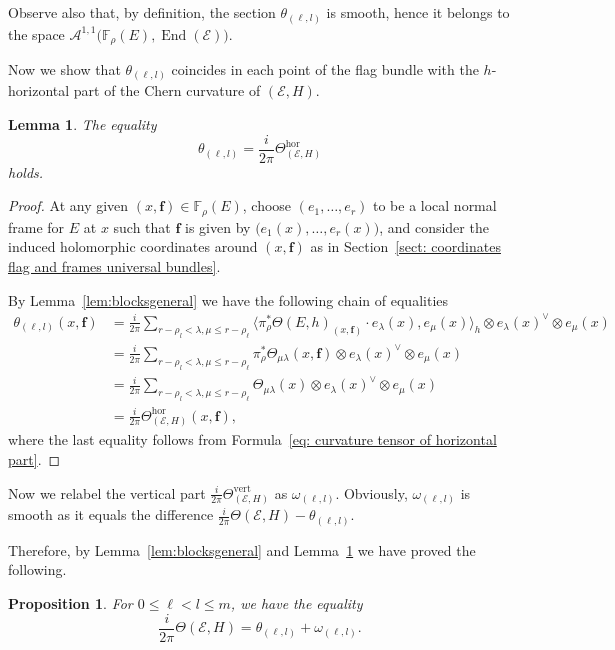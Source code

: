 \documentclass[a4paper]{amsart}
\theoremstyle{plain}%
\newtheorem{lemma}[theorem]{Lemma}
\newtheorem{proposition}[theorem]{Proposition}
\theoremstyle{definition}
\theoremstyle{remark}
\newcommand{\FF}{\mathbb{F}}
\begin{document}
Observe also that, by definition, the section $ \theta_{(\ell,l)} $ is smooth, hence it belongs to the space $ \mathcal{A}^{1,1}\bigl(\FF_{\rho}(E),\operatorname{End}(\mathcal{E})\bigr) $.

Now we show that $ \theta_{(\ell,l)} $ coincides in each point of the flag bundle with the $ h $-horizontal part of the Chern curvature of $ (\mathcal{E},H) $.
\begin{lemma}\label{lem: definizione di theta generale}
	The equality
	\[
	\theta_{(\ell,l)} = \frac{i}{2\pi}\Theta_{(\mathcal{E},H)}^{\operatorname{hor}}
	\]
	holds.
\end{lemma}
\begin{proof}
	At any given $ (x,\mathbf{f}) \in \FF_{\rho}(E) $, choose $ (e_1,\dots,e_r) $ to be a local normal frame for $ E $ at $ x $ such that $ \mathbf{f} $ is given by $ \bigl(e_1(x),\dots,e_r(x)\bigr) $, and consider the induced holomorphic coordinates around $ (x,\mathbf{f})$ as in Section~\ref{sect: coordinates flag and frames universal bundles}.
	
	By Lemma~\ref{lem:blocksgeneral} we have the following chain of equalities
	\begin{align*}
		\theta_{(\ell,l)}(x,\mathbf{f}) &= \frac{i}{2\pi} \sum_{r-\rho_l < \lambda,\mu \le r-\rho_{\ell}} \bigl\langle \pi_{\rho}^*\Theta(E,h)_{(x,\mathbf{f})}\cdot {e_\lambda(x)}, {e_\mu(x)} \bigr\rangle_h \otimes {e_{\lambda}(x)}^{\vee} \otimes e_{\mu}(x) \\
		&= \frac{i}{2\pi} \sum_{r-\rho_l < \lambda,\mu \le r-\rho_{\ell}} \pi_{\rho}^*\Theta_{\mu\lambda}(x,\mathbf{f}) \otimes {e_{\lambda}(x)}^{\vee} \otimes e_{\mu}(x) \\
		&= \frac{i}{2\pi} \sum_{r-\rho_l < \lambda,\mu \le r-\rho_{\ell}} \Theta_{\mu\lambda}(x) \otimes {e_{\lambda}(x)}^{\vee} \otimes e_{\mu}(x) \\
		&= \frac{i}{2\pi} \Theta_{(\mathcal{E},H)}^{\operatorname{hor}}(x,\mathbf{f}),
	\end{align*}
	where the last equality follows from Formula~\eqref{eq: curvature tensor of horizontal part}.
\end{proof}

Now we relabel the vertical part $ \frac{i}{2\pi} \Theta_{(\mathcal{E},H)}^{\operatorname{vert}} $ as $ \omega_{(\ell,l)} $.
Obviously, $ \omega_{(\ell,l)} $ is smooth as it equals the difference $ \frac{i}{2\pi} \Theta(\mathcal{E},H) - \theta_{(\ell,l)} $.

Therefore, by Lemma~\ref{lem:blocksgeneral} and Lemma~\ref{lem: definizione di theta generale} we have proved the following.
\begin{proposition}
	For $ 0 \le \ell < l \le m $, we have the equality
	\begin{equation}\label{eq: curvature of universal is sum of two tensors}
		\frac{i}{2\pi} \Theta(\mathcal{E},H) = \theta_{(\ell,l)} + \omega_{(\ell,l)} .
	\end{equation}
\end{proposition}
\end{document}
